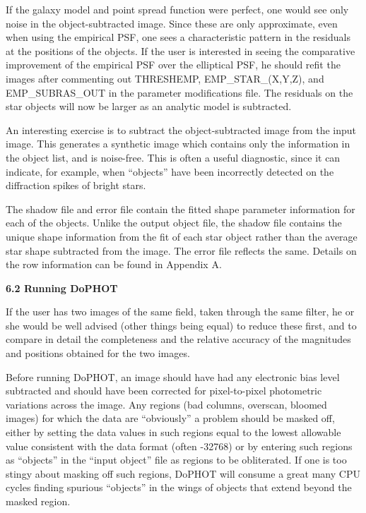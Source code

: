 {If the galaxy model and point spread function were perfect, 
one would see only noise in the object-subtracted image.  
Since these are only approximate, even when using the 
empirical PSF, one sees a characteristic pattern in the
residuals at the positions of the objects.  If the user is interested 
in seeing the comparative improvement of the empirical PSF 
over the elliptical PSF, he should refit the images after commenting
out THRESHEMP, EMP\_STAR\_(X,Y,Z), and 
EMP\_SUBRAS\_OUT in the parameter modifications file.  The 
residuals on the star objects will now be larger as an analytic 
model is subtracted. 
 
An interesting exercise is to subtract the object-subtracted
image from the input image.  This generates a synthetic
image which contains only the information in the object
list, and is noise-free.  This is often a useful diagnostic,
since it can indicate, for example, when ``objects'' have
been incorrectly detected on the diffraction spikes of
bright stars.

The shadow file and error file contain the fitted shape parameter
information for each of the objects.  Unlike the output object file,
the shadow file contains the unique shape information from the 
fit of each star object rather than the average star shape subtracted 
from the image.  The error file reflects the same.  Details on the
row information can be found in Appendix A.

\centerline{\bf 6.2 Running DoPHOT}

If the user has two images of the same field, taken through
the same filter, he or she would be well advised (other
things being equal) to reduce these first, and to compare in
detail the completeness and the relative accuracy of the magnitudes
and positions obtained for the two images.

Before running DoPHOT, an image should have had any
electronic bias level subtracted and should have been
corrected for pixel-to-pixel photometric variations across
the image.  Any regions (bad columns, overscan, bloomed
images) for which the data are ``obviously'' a problem
should be masked off, either by setting the data values in
such regions equal to the lowest allowable value consistent
with the data format (often -32768) or by entering such
regions as ``objects'' in the ``input object'' file as
regions to be obliterated.  If one is too stingy about
masking off such regions, DoPHOT will consume a great many
CPU cycles finding spurious ``objects'' in the wings of
objects that extend beyond the masked region.

}
